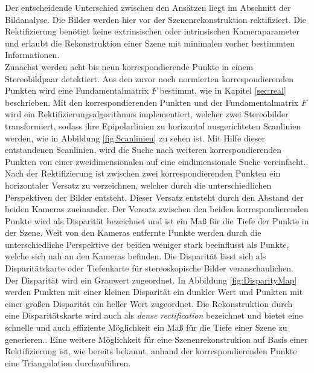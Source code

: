 Der entscheidende Unterschied zwischen den Ansätzen liegt im Abschnitt der Bildanalyse. Die Bilder werden hier vor der Szenenrekonstruktion rektifiziert. Die Rektifizierung benötigt keine extrinsischen oder intrinsischen Kameraparameter und erlaubt die Rekonstruktion einer Szene mit minimalen vorher bestimmten Informationen\cite{ZZ,Javier,Fusiello,phdextrinsicPara}.\\

%

Zunächst werden acht bis neun korrespondierende Punkte in einem Stereobildpaar detektiert. Aus den zuvor noch normierten korrespondierenden Punkten wird eine Fundamentalmatrix $F$ bestimmt, wie in Kapitel \ref{sec:real} beschrieben. Mit den korrespondierenden Punkten und der Fundamentalmatrix $F$ wird ein Rektifizierungsalgorithmus implementiert, welcher zwei Stereobilder transformiert, sodass ihre Epipolarlinien zu horizontal ausgerichteten Scanlinien werden, wie in Abbildung \ref{fig:Scanlinien} zu sehen ist. Mit Hilfe dieser entstandenen Scanlinien, wird die Suche nach weiteren korrespondierenden Punkten von einer zweidimensionalen auf eine eindimensionale Suche vereinfacht.\cite{ZZ,Fusiello,Javier}.\\

Nach der Rektifizierung ist zwischen zwei korrespondierenden Punkten ein horizontaler Versatz zu verzeichnen, welcher durch die unterschiedlichen Perspektiven der Bilder entsteht. Dieser Versatz entsteht durch den Abstand der beiden Kameras zueinander. Der Versatz zwischen den beiden korrespondierenden Punkte wird als Disparität bezeichnet und ist ein Maß für die Tiefe der Punkte in der Szene\cite{Javier,Fusiello}. Weit von den Kameras entfernte Punkte werden durch die unterschiedliche Perspektive der beiden weniger stark beeinflusst als Punkte, welche sich nah an den Kameras befinden. Die Disparität lässt sich als Disparitätskarte oder Tiefenkarte für stereoskopische Bilder veranschaulichen\cite{Javier}. Der Disparität wird ein Grauwert zugeordnet. In Abbildung \ref{fig:DisparityMap} werden Punkten mit einer kleinen Disparität ein dunkler Wert und Punkten mit einer großen Disparität ein heller Wert zugeordnet. Die Rekonstruktion durch eine Disparitätskarte wird auch als \textit{dense rectification} bezeichnet und bietet eine schnelle und auch effiziente Möglichkeit ein Maß für die Tiefe einer Szene zu generieren.\cite{Javier,Fusiello,ZZ}. Eine weitere Möglichkeit für eine Szenenrekonstrukion auf Basis einer Rektifizierung ist, wie bereits bekannt, anhand der korrespondierenden Punkte eine Triangulation durchzuführen\cite{Javier}.\\

